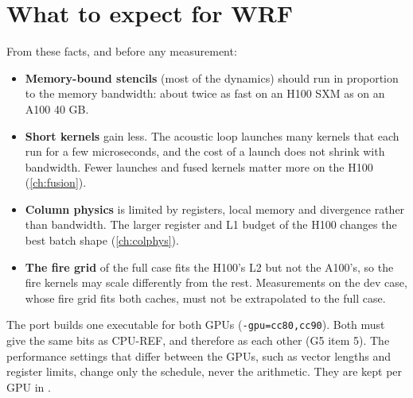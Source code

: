 \section{What to expect for WRF}

From these facts, and before any measurement:
\begin{itemize}
  \item \textbf{Memory-bound stencils} (most of the dynamics) should run in proportion to the memory bandwidth:
    about twice as fast on an H100 SXM as on an A100 40 GB.
  \item \textbf{Short kernels} gain less. The acoustic loop launches many kernels that each run for a few
    microseconds, and the cost of a launch does not shrink with bandwidth. Fewer launches and fused kernels matter
    more on the H100 (\cref{ch:fusion}).
  \item \textbf{Column physics} is limited by registers, local memory and divergence rather than bandwidth. The
    larger register and L1 budget of the H100 changes the best batch shape (\cref{ch:colphys}).
  \item \textbf{The fire grid} of the full case fits the H100's L2 but not the A100's, so the fire kernels may scale
    differently from the rest. Measurements on the dev case, whose fire grid fits both caches, must not be
    extrapolated to the full case.
\end{itemize}

\begin{portnote}
The port builds one executable for both GPUs (\texttt{-gpu=cc80,cc90}). Both must give the same bits as CPU-REF,
and therefore as each other (G5 item 5). The performance settings that differ between the GPUs, such as vector
lengths and register limits, change only the schedule, never the arithmetic. They are kept per GPU in
.
\end{portnote}
